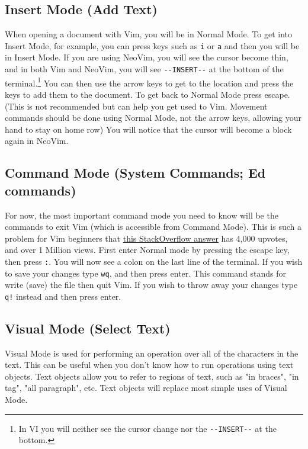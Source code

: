 \documentclass[11pt]{article}
\begin{document}
\subsection{Insert Mode (Add Text)}
\label{sec:org14575ff}
When opening a document with Vim, you will be in Normal Mode. To get into Insert
Mode, for example, you can press keys such as \texttt{i} or \texttt{a} and then you will be in
Insert Mode. If you are using NeoVim, you will see the cursor become thin, and
in both Vim and NeoVim, you will see \texttt{-{}-INSERT-{}-} at the bottom of the
terminal.\footnote{In VI you will neither see the cursor change nor the 
\texttt{-{}-INSERT-{}-} at the bottom.} You can then use the arrow keys to get to the location and press
the keys to add them to the document. To get back to Normal Mode press escape.
(This is not recommended but can help you get used to Vim. Movement commands
should be done using Normal Mode, not the arrow keys, allowing your hand to stay
on home row) You will notice that the cursor will become a block again in
NeoVim.
\subsection{Command Mode (System Commands; Ed commands)}
\label{sec:orgc7dcaed}
For now, the most important command mode you need to know will be the commands
to exit Vim (which is accessible from Command Mode). This is such a problem for
Vim beginners that \href{https://stackoverflow.com/questions/11828270/how-to-exit-the-vim-editor}{this StackOverflow answer} has 4,000 upvotes, and over 1
Million views. First enter Normal mode by pressing the escape key, then press
\texttt{:}. You will now see a colon on the last line of the terminal. If you wish to
save your changes type \texttt{wq}, and then press enter. This command stands for write
(save) the file then quit Vim. If you wish to throw away your changes type \texttt{q!}
instead and then press enter.
\subsection{Visual Mode (Select Text)}
\label{sec:org732d184}
Visual Mode is used for performing an operation over all of the characters in
the text. This can be useful when you don't know how to run operations using
text objects. Text objects allow you to refer to regions of text, such as "in
braces", "in tag", "all paragraph", etc. Text objects will replace most simple
uses of Visual Mode.
\end{document}
